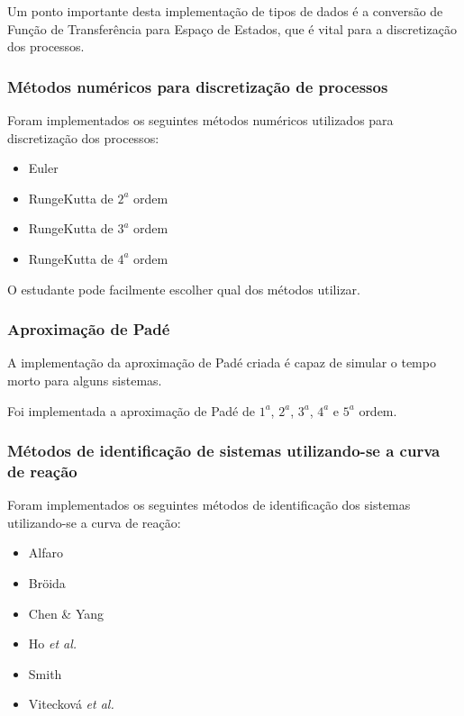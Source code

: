             Um ponto importante desta implementação de tipos de dados é a conversão de Função
            de Transferência para Espaço de Estados, que é vital para a discretização dos
            processos.

        \subsubsection{Métodos numéricos para discretização de processos}

            Foram implementados os seguintes métodos numéricos utilizados para discretização dos processos:

            \begin{itemize}
                \item Euler
                \item RungeKutta de $2^a$ ordem
                \item RungeKutta de $3^a$ ordem
                \item RungeKutta de $4^a$ ordem
            \end{itemize}

            O estudante pode facilmente escolher qual dos métodos utilizar.

        \subsubsection{Aproximação de Padé}
            
            A implementação da aproximação de Padé criada é capaz de simular o tempo morto
            para alguns sistemas.

            Foi implementada a aproximação de Padé de $1^a$, $2^a$, $3^a$, $4^a$ e $5^a$ ordem.

        \subsubsection{Métodos de identificação de sistemas utilizando-se a curva de reação}
            
            Foram implementados os seguintes métodos de identificação dos sistemas utilizando-se
            a curva de reação:

            \begin{itemize}
                \item Alfaro
                \item Bröida
                \item Chen \& Yang
                \item Ho \textit{et al.}
                \item Smith
                \item Vitecková \textit{et al.}
            \end{itemize}

